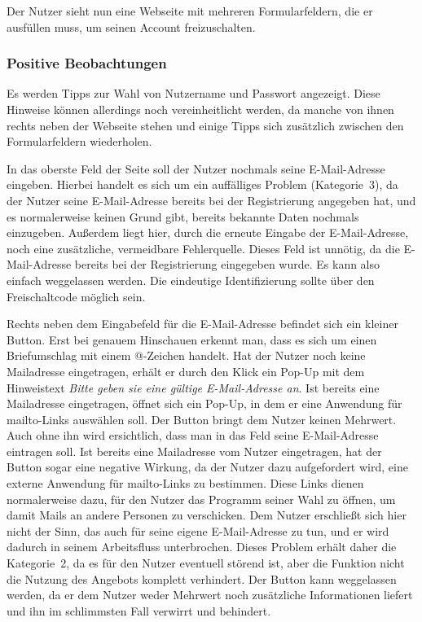 Der Nutzer sieht nun eine Webseite mit mehreren Formularfeldern, die er ausfüllen muss, um seinen Account freizuschalten.

\subsubsection*{Positive Beobachtungen}
\label{subsubsec:freischaltung_webseite_positiv}
Es werden Tipps zur Wahl von Nutzername und Passwort angezeigt. Diese Hinweise können allerdings noch vereinheitlicht werden, da manche von ihnen rechts neben der Webseite stehen und einige Tipps sich zusätzlich zwischen den Formularfeldern wiederholen.

{
In das oberste Feld der Seite soll der Nutzer nochmals seine E\hbox{-}Mail-Adresse eingeben.
}
{
Hierbei handelt es sich um ein auffälliges Problem (Kategorie~3), da der Nutzer seine E\hbox{-}Mail-Adresse bereits bei der Registrierung angegeben hat, und es normalerweise keinen Grund gibt, bereits bekannte Daten nochmals einzugeben. Außerdem liegt hier, durch die erneute Eingabe der E\hbox{-}Mail-Adresse, noch eine zusätzliche, vermeidbare Fehlerquelle.
}
{
Dieses Feld ist unnötig, da die E\hbox{-}Mail-Adresse bereits bei der Registrierung eingegeben wurde. Es kann also einfach weggelassen werden. Die eindeutige Identifizierung sollte über den Freischaltcode möglich sein.
}
\label{prob:frei:emaileingabe}

{
Rechts neben dem Eingabefeld für die E\hbox{-}Mail-Adresse befindet sich ein kleiner Button. Erst bei genauem Hinschauen erkennt man, dass es sich um einen Briefumschlag mit einem @-Zeichen handelt. Hat der Nutzer noch keine Mailadresse eingetragen, erhält er durch den Klick ein Pop-Up mit dem Hinweistext \emph{ Bitte geben sie eine gültige E\hbox{-}Mail-Adresse an}. Ist bereits eine Mailadresse eingetragen, öffnet sich ein Pop-Up, in dem er eine Anwendung für mailto-Links auswählen soll.
}
{
Der Button bringt dem Nutzer keinen Mehrwert. Auch ohne ihn wird ersichtlich, dass man in das Feld seine E\hbox{-}Mail-Adresse eintragen soll. Ist bereits eine Mailadresse vom Nutzer eingetragen, hat der Button sogar eine negative Wirkung, da der Nutzer dazu aufgefordert wird, eine externe Anwendung für mailto-Links zu bestimmen. Diese Links dienen normalerweise dazu, für den Nutzer das Programm seiner Wahl zu öffnen, um damit Mails an andere Personen zu verschicken. Dem Nutzer erschließt sich hier nicht der Sinn, das auch für seine eigene E\hbox{-}Mail-Adresse zu tun, und er wird dadurch in seinem Arbeitsfluss unterbrochen. Dieses Problem erhält daher die Kategorie~2, da es für den Nutzer eventuell störend ist, aber die Funktion nicht die Nutzung des Angebots komplett verhindert.
}
{
Der Button kann weggelassen werden, da er dem Nutzer weder Mehrwert noch zusätzliche Informationen liefert und ihn im schlimmsten Fall verwirrt und behindert.
}
\label{prob:frei:buttonmailto}

